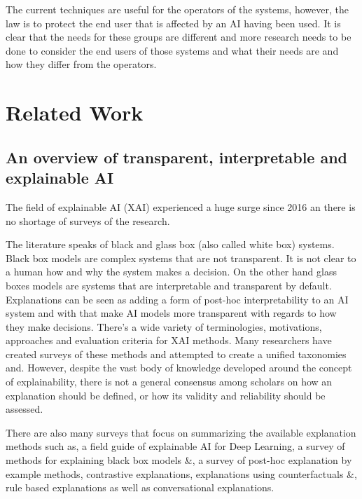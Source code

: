 \documentclass[manuscript,screen,review]{acmart}
\begin{document}
The current techniques are useful for the operators of the systems, however, the law is to protect the end user that is affected by an AI having been used. It is clear that the needs for these groups are different and more research needs to be done to consider the end users of those systems and what their needs are and how they differ from the operators.\\

\newpage
\section{Related Work}\label{sec:related-work}
%
%

\subsection{An overview of transparent, interpretable and explainable AI}\label{subsec:an-overview-of-transparent-interpretable-and-explainable-ai}
The field of explainable AI (XAI) experienced a huge surge since 2016 an there is no shortage of surveys of the research.

The literature speaks of black and glass box (also called white box) systems.
Black box models are complex systems that are not transparent.
It is not clear to a human how and why the system makes a decision.
On the other hand glass boxes models are systems that are interpretable and transparent by default.
Explanations can be seen as adding a form of post-hoc interpretability to an AI system and with that make AI models more transparent with regards to how they make decisions.
There's a wide variety of terminologies, motivations, approaches and evaluation criteria for XAI methods.
Many researchers have created surveys of these methods and attempted to create a unified taxonomies \cite{Linardatos2021} and\cite{Schwalbe2021}.
However, despite the vast body of knowledge developed around the concept of explainability, there is not a general consensus among scholars on how an explanation should be defined, or how its validity and reliability should be assessed\cite{Vilone2021}.

There are also many surveys that focus on summarizing the available explanation methods such as\cite{Vilone2020},
a field guide of explainable AI for Deep Learning\cite{Ras2020}, a survey of methods for explaining black box models\cite{Guidotti2018a} \&\cite{Adadi2018},
a survey of post-hoc explanation by example methods\cite{Keane2019}, contrastive explanations\cite{Miller2021},
explanations using counterfactuals\cite{Verma2020} \&\cite{Keane2020}, rule based explanations\cite{Guidotti2018} as well
as conversational explanations\cite{Sokol2018}.
\end{document}
